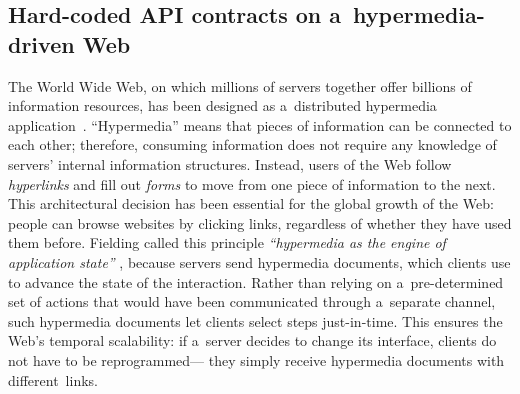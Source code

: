 % 
% 
% 


\subsection{Hard-coded API contracts on a~hypermedia-driven Web}
The World Wide Web,
on which millions of servers together offer billions of information resources,
has been designed as a~distributed hypermedia application~\cite{bernerslee_1992}.
\enquote{Hypermedia} means that pieces of information can be connected to each other;
therefore, consuming information
does not require any knowledge of servers' internal information structures.
Instead, users of the Web follow \emph{hyperlinks} and fill out \emph{forms}
to move from one piece of information to the next.
This architectural decision has been essential for the global growth of the Web:
people can browse websites by clicking links,
regardless of whether they have used them before.
Fielding called this principle
\emph{\enquote{hypermedia as the engine of application state}} \cite{REST},
because servers send hypermedia documents,
which clients use to advance the state of the interaction.
Rather than relying on a~pre-determined set of actions
that would have been communicated through a~separate channel,
such hypermedia documents let clients select steps just-in-time.
This ensures the Web's temporal scalability:
if a~server decides to change its interface,
clients do not have to be reprogrammed---%
they simply receive hypermedia documents with different~links.

